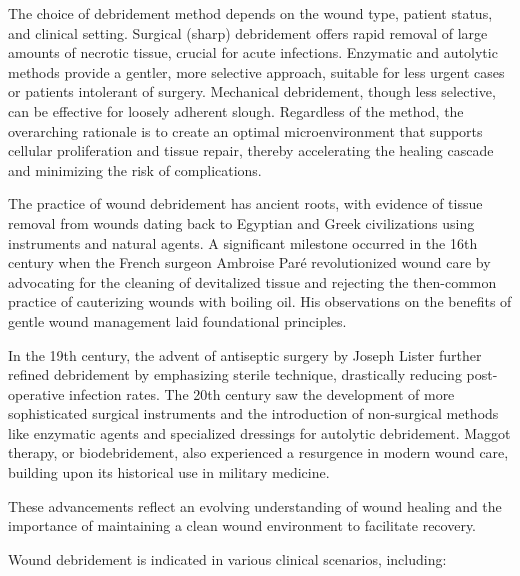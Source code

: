 The choice of debridement method depends on the wound type, patient status, and clinical setting. Surgical (sharp) debridement offers rapid removal of large amounts of necrotic tissue, crucial for acute infections. Enzymatic and autolytic methods provide a gentler, more selective approach, suitable for less urgent cases or patients intolerant of surgery. Mechanical debridement, though less selective, can be effective for loosely adherent slough. Regardless of the method, the overarching rationale is to create an optimal microenvironment that supports cellular proliferation and tissue repair, thereby accelerating the healing cascade and minimizing the risk of complications.

The practice of wound debridement has ancient roots, with evidence of tissue removal from wounds dating back to Egyptian and Greek civilizations using instruments and natural agents. A significant milestone occurred in the 16th century when the French surgeon Ambroise Par\'{e} revolutionized wound care by advocating for the cleaning of devitalized tissue and rejecting the then-common practice of cauterizing wounds with boiling oil. His observations on the benefits of gentle wound management laid foundational principles. 

In the 19th century, the advent of antiseptic surgery by Joseph Lister further refined debridement by emphasizing sterile technique, drastically reducing post-operative infection rates. The 20th century saw the development of more sophisticated surgical instruments and the introduction of non-surgical methods like enzymatic agents and specialized dressings for autolytic debridement. Maggot therapy, or biodebridement, also experienced a resurgence in modern wound care, building upon its historical use in military medicine. 

These advancements reflect an evolving understanding of wound healing and the importance of maintaining a clean wound environment to facilitate recovery.

Wound debridement is indicated in various clinical scenarios, including:

